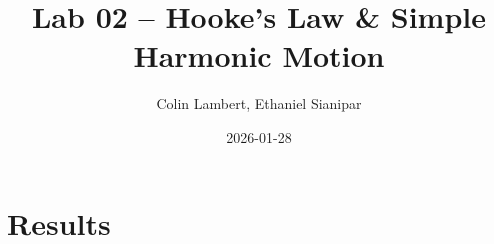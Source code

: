 \documentclass[12pt, letterpaper]{article}
\title{Lab 02 -- Hooke's Law \& Simple Harmonic Motion}
\author{Colin Lambert, Ethaniel Sianipar}
\date{2026-01-28}
\begin{document}
\maketitle

\section{Results}
\end{document}

